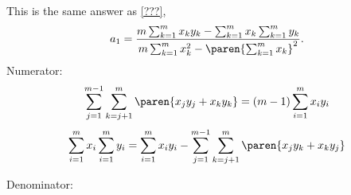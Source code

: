 This is the same answer as \eqref{???},
  \begin{equation*}   %
      a_{1} = \frac{m \sum_{k=1}^{m}x_{k}y_{k} - \sum_{k=1}^{m}x_{k}\sum_{k=1}^{m}y_{k}} {m \sum_{k=1}^{m}x_{k}^{2} - \paren{\sum_{k=1}^{m}x_{k}}^{2}} .
  \end{equation*}
Numerator:
  \begin{equation*}   %
      \sum_{j=1}^{m-1} \sum_{k=j+1}^{m} \paren{x_{j}y_{j} + x_{k}y_{k}} = (m-1) \sum_{i=1}^{m} x_{i}y_{i}
   \label{eq:rule 1}
  \end{equation*}
  \begin{equation*}   %
   	  \sum_{i=1}^{m}x_{i} \sum_{i=1}^{m}y_{i} = \sum_{i=1}^{m}x_{i}y_{i} - 
      \sum_{j=1}^{m-1} \sum_{k=j+1}^{m} \paren{x_{j}y_{k} + x_{k}y_{j}} 
   \label{eq:rule 2}
  \end{equation*}


Denominator:

\endinput

